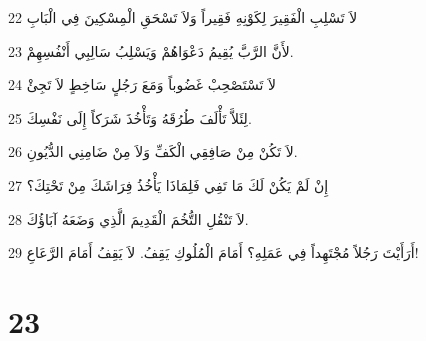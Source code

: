 \par 22 لاَ تَسْلِبِ الْفَقِيرَ لِكَوْنِهِ فَقِيراً وَلاَ تَسْحَقِ الْمِسْكِينَ فِي الْبَابِ
\par 23 لأَنَّ الرَّبَّ يُقِيمُ دَعْوَاهُمْ وَيَسْلِبُ سَالِبِي أَنْفُسِهِمْ.
\par 24 لاَ تَسْتَصْحِبْ غَضُوباً وَمَعَ رَجُلٍ سَاخِطٍ لاَ تَجِئْ
\par 25 لِئَلاَّ تَأْلَفَ طُرُقَهُ وَتَأْخُذَ شَرَكاً إِلَى نَفْسِكَ.
\par 26 لاَ تَكُنْ مِنْ صَافِقِي الْكَفِّ وَلاَ مِنْ ضَامِنِي الدُّيُونِ.
\par 27 إِنْ لَمْ يَكُنْ لَكَ مَا تَفِي فَلِمَاذَا يَأْخُذُ فِرَاشَكَ مِنْ تَحْتِكَ؟
\par 28 لاَ تَنْقُلِ التُّخُمَ الْقَدِيمَ الَّذِي وَضَعَهُ آبَاؤُكَ.
\par 29 أَرَأَيْتَ رَجُلاً مُجْتَهِداً فِي عَمَلِهِ؟ أَمَامَ الْمُلُوكِ يَقِفُ. لاَ يَقِفُ أَمَامَ الرَّعَاعِ!

\chapter{23}

